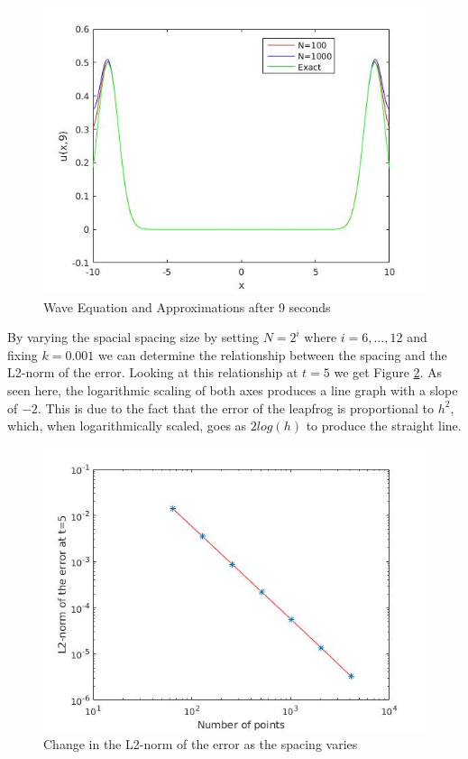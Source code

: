 \begin{figure}[H]
 \centering
 \includegraphics[scale=0.5]{Images/leapfrog_wave.jpg}
 \caption{Wave Equation and Approximations after 9 seconds}
 \label{leapfrog_wave}
\end{figure}
By varying the spacial spacing size by setting $N=2^i$ where $i=6,\dots,12$ and fixing $k=0.001$ we can determine the relationship between the spacing and the L2-norm of the error. Looking at this relationship at $t=5$ we get Figure \ref{leapfrog_wave_Nh}. As seen here, the logarithmic scaling of both axes produces a line graph with a slope of $-2$. This is due to the fact that the error of the leapfrog is proportional to $h^2$, which, when logarithmically scaled, goes as $2log(h)$ to produce the straight line.
\begin{figure}[H]
 \centering
 \includegraphics[scale=0.5]{Images/leapfrog_wave_Nh.jpg}
 \caption{Change in the L2-norm of the error as the spacing varies}
 \label{leapfrog_wave_Nh}
\end{figure}
